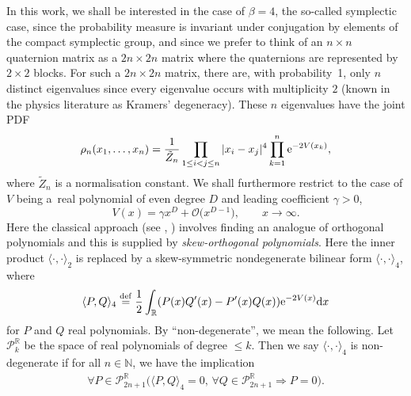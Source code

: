 \documentclass[pdftex]{sigma}
\numberwithin{equation}{section}
\begin{document}
In this work, we shall be interested in the case of $\beta = 4$, the so-called symplectic case, since the probability measure is invariant under conjugation by elements of the compact symplectic group, and since we prefer to think of an $n\times n$ quaternion matrix as a $2n \times 2n$ matrix where the quaternions are represented by $2 \times 2$ blocks. For such a $2n \times 2n$ matrix, there are, with probability~1, only $n$ distinct eigenvalues since every eigenvalue occurs with multiplicity $2$ (known in the physics literature as Kramers' degeneracy). These $n$ eigenvalues have the joint PDF
\begin{align}\label{pointprocess}
\rho_n(x_1, \dots, x_n) = \frac{1}{\tilde{Z}_n} \prod_{1 \leq i < j \leq n}|x_i - x_j|^4 \prod_{k=1}^{n} {\rm e}^{-2V(x_k)},
\end{align}
where $\tilde{Z}_n $ is a normalisation constant. We shall furthermore restrict to the case of $V$ being a~real polynomial of even degree $D$ and leading coefficient $\gamma > 0$,
\[
V(x) = \gamma x^D + \mathcal{O}\big(x^{D-1}\big),\qquad x \to \infty.
\]
Here the classical approach (see \cite[Chapter 5]{mehta}, \cite[Chapter 6]{loggases}) involves finding an analogue of orthogonal polynomials and this is supplied by \textit{skew-orthogonal polynomials}. Here the inner product $\langle \cdot, \cdot \rangle_2$ is replaced by a skew-symmetric nondegenerate bilinear form $\langle \cdot, \cdot \rangle_4$, where
\begin{equation}\label{skewprod}
\langle P, Q \rangle_4 \overset{\mathrm{def}}{=} \frac{1}{2} \int_{\mathbb{R}} ( P(x) Q^\prime(x)-P^\prime(x) Q(x) ) {\rm e}^{-2V(x)} {\rm d}x
\end{equation}
for $P$ and $Q$ real polynomials. By \enquote{non-degenerate}, we mean the following. Let $\mathscr{P}_k^\mathbb{R}$ be the space of real polynomials of degree $\leq k$. Then we say $\langle \cdot, \cdot \rangle_4$ is non-degenerate if for all $n \in \mathbb{N}$, we have the implication
\begin{align*}
\forall P \in \mathscr{P}_{2n+1}^\mathbb{R} \big( \langle P, Q \rangle_4 = 0,\, \forall Q \in \mathscr{P}_{2n+1}^\mathbb{R} \Longrightarrow P = 0\big).
\end{align*}
\end{document}
